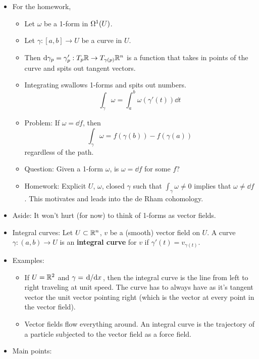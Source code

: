 \documentclass[../notes.tex]{subfiles}
\begin{document}
\begin{itemize}
    \item For the homework,
    \begin{itemize}
        \item Let $\omega$ be a 1-form in $\ome[1]{U}$.
        \item Let $\gamma:[a,b]\to U$ be a curve in $U$.
        \item Then $\dd{\gamma_p}=\gamma_p':T_p\R\to T_{\gamma(p)}\R^n$ is a function that takes in points of the curve and spits out tangent vectors.
        \item Integrating swallows 1-forms and spits out numbers.
        \begin{equation*}
            \int_\gamma\omega = \int_a^b\omega(\gamma'(t))\dd{t}
        \end{equation*}
        \item Problem: If $\omega=\dd{f}$, then
        \begin{equation*}
            \int_\gamma\omega = f(\gamma(b))-f(\gamma(a))
        \end{equation*}
        regardless of the path.
        \item Question: Given a 1-form $\omega$, is $\omega=\dd{f}$ for some $f$?
        \item Homework: Explicit $U$, $\omega$, closed $\gamma$ such that $\int_\gamma\omega\neq 0$ implies that $\omega\neq\dd{f}$. This motivates and leads into the de Rham cohomology.
    \end{itemize}
    \item Aside: It won't hurt (for now) to think of 1-forms as vector fields.
    \item Integral curves: Let $U\subset\R^n$, $v$ be a (smooth) vector field on $U$. A curve $\gamma:(a,b)\to U$ is an \textbf{integral curve} for $v$ if $\gamma'(t)=v_{\gamma(t)}$.
    \item Examples:
    \begin{itemize}
        \item If $U=\R^2$ and $\gamma=\dv*{x}$, then the integral curve is the line from left to right traveling at unit speed. The curve has to always have as it's tangent vector the unit vector pointing right (which is the vector at every point in the vector field).
        \item Vector fields flow everything around. An integral curve is the trajectory of a particle subjected to the vector field as a force field.
    \end{itemize}
    \item Main points:

\end{itemize}
\end{document}
